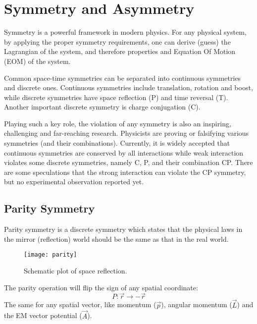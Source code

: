 \section{Symmetry and Asymmetry}
Symmetry is a powerful framework in modern physics. For any physical system, 
by applying the proper symmetry requirements, one can derive (guess) 
the Lagrangian of the system, and therefore properties and Equation Of Motion (EOM)
of the system.

Common space-time symmetries can be separated into continuous symmetries 
and discrete ones. Continuous symmetries include translation, rotation and
boost, while discrete symmetries have space reflection (P) and time reversal (T).
Another important discrete symmetry is charge conjugation (C).

Playing such a key role, the violation of any symmetry is also an inspiring, challenging
and far-reaching research. Physicists are proving or falsifying various
symmetries (and their combinations). Currently, it is widely accepted that continuous
symmetries are conserved by all interactions while weak interaction violates
some discrete symmetries, namely C, P, and their combination CP. There are some
speculations that the strong interaction can violate the CP symmetry, but no
experimental observation reported yet.

\subsection{Parity Symmetry}
Parity symmetry is a discrete symmetry which states that the physical laws in
the mirror (reflection) world should be the same as that in the real world. 
\begin{figure}[H]
    \centering
    \texttt{[image: parity]}
    \caption{Schematic plot of space reflection.}
\end{figure}

The parity operation will flip the sign of any spatial coordinate:
\begin{equation}
    P: \vec{r} \rightarrow -\vec{r}
\end{equation}
The same for any spatial vector, like momentum ($\vec{p}$), angular momentum ($\vec{L}$)
and the EM vector potential ($\vec{A}$).

